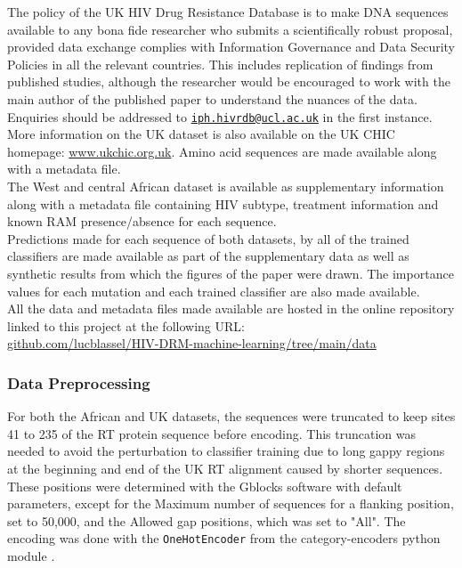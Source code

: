 \documentclass[
  11,
]{scrbook}
\begin{document}
The policy of the UK HIV Drug Resistance Database is to make DNA
sequences available to any bona fide researcher who submits a
scientifically robust proposal, provided data exchange complies with
Information Governance and Data Security Policies in all the relevant
countries. This includes replication of findings from published studies,
although the researcher would be encouraged to work with the main author
of the published paper to understand the nuances of the data. Enquiries
should be addressed to \href{mailto:iph.hivrdb@ucl.ac.uk}{\nolinkurl{iph.hivrdb@ucl.ac.uk}} in the first instance.
More information on the UK dataset is also available on the UK CHIC
homepage: \href{http://www.ukchic.org.uk/}{www.ukchic.org.uk}. Amino acid
sequences are made available along with a metadata file.\\
The West and central African dataset is available as supplementary
information along with a metadata file containing HIV subtype, treatment
information and known RAM presence/absence for each sequence.\\
Predictions made for each sequence of both datasets, by all of the
trained classifiers are made available as part of the supplementary data
as well as synthetic results from which the figures of the paper were
drawn. The importance values for each mutation and each trained
classifier are also made available.\\
All the data and metadata files made available are hosted in the online
repository linked to this project at the following URL:\\
\href{https://github.com/lucblassel/HIV-DRM-machine-learning/tree/main/data}{github.com/lucblassel/HIV-DRM-machine-learning/tree/main/data}

\hypertarget{data-preprocessing}{%
\subsubsection{Data Preprocessing}\label{data-preprocessing}}

For both the African and UK datasets, the sequences were truncated to
keep sites 41 to 235 of the RT protein sequence before encoding. This
truncation was needed to avoid the perturbation to classifier training
due to long gappy regions at the beginning and end of the UK RT
alignment caused by shorter sequences. These positions were determined
with the Gblocks software \autocite{castresanaSelectionConservedBlocks2000} with
default parameters, except for the Maximum number of sequences for a
flanking position, set to 50,000, and the Allowed gap positions, which
was set to "All". The encoding was done with the \texttt{OneHotEncoder} from
the category-encoders python module
\autocite{mcginnisScikitLearnContribCategoricalEncodingRelease2018}.
\end{document}
